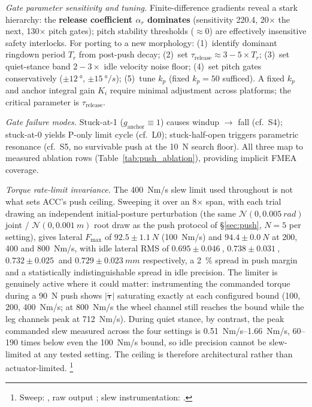 \documentclass[conference]{IEEEtran}
\begin{document}
\emph{Gate parameter sensitivity and tuning.}
Finite-difference gradients reveal a stark hierarchy: the \textbf{release coefficient $\alpha_r$ dominates} (sensitivity 220.4, \num{20}$\times$ the next, \num{130}$\times$ pitch gates); pitch stability thresholds (${\approx}0$) are effectively insensitive safety interlocks.
For porting to a new morphology: (1)~identify dominant ringdown period $T_r$ from post-push decay; (2)~set $\tau_{\text{release}} {\approx} 3{-}5{\times}T_r$; (3)~set quiet-stance band $2{-}3{\times}$ idle velocity noise floor; (4)~set pitch gates conservatively ($\pm\SI{12}{\degree}$, $\pm\SI{15}{\degree/s}$); (5)~tune $k_p$ (fixed $k_p{=}50$ sufficed).
A fixed $k_p$ and anchor integral gain $K_i$ require minimal adjustment across platforms; the critical parameter is $\tau_{\text{release}}$.

\emph{Gate failure modes.}
Stuck-at-1 ($g_{\text{anchor}}{\equiv}1$) causes windup $\rightarrow$ fall (cf.\ S4); stuck-at-0 yields P-only limit cycle (cf.\ L0); stuck-half-open triggers parametric resonance (cf.\ S5, no survivable push at the \SI{10}{N} search floor). All three map to measured ablation rows (Table~\ref{tab:push_ablation}), providing implicit FMEA coverage.

\emph{Torque rate-limit invariance.}
The \SI{400}{Nm/s} slew limit used throughout is not what sets ACC's push
ceiling. Sweeping it over an \num{8}$\times$ span, with each trial drawing an
independent initial-posture perturbation (the same
$\mathcal{N}(0,\SI{0.005}{rad})$ joint / $\mathcal{N}(0,\SI{0.001}{m})$ root
draw as the push protocol of \S\ref{sec:push}, $N{=}5$ per setting), gives
lateral $F_{\max}$ of $92.5{\pm}\SI{1.1}{N}$ (\SI{100}{Nm/s}) and
$94.4{\pm}\SI{0.0}{N}$ at \SI{200}{}, \SI{400}{} and \SI{800}{Nm/s}, with idle
lateral RMS of $0.695{\pm}\SI{0.046}{}$, $0.738{\pm}\SI{0.031}{}$,
$0.732{\pm}\SI{0.025}{}$ and $0.729{\pm}\SI{0.023}{mm}$ respectively, a \SI{2}{\percent} spread in push margin and a statistically indistinguishable
spread in idle precision.
The limiter is genuinely active where it could matter: instrumenting the
commanded torque during a \SI{90}{N} push shows $|\dot{\boldsymbol{\tau}}|$
saturating exactly at each configured bound (\SI{100}{}, \SI{200}{},
\SI{400}{Nm/s}; at \SI{800}{Nm/s} the wheel channel still reaches the bound
while the leg channels peak at \SI{712}{Nm/s}). During quiet stance, by
contrast, the peak commanded slew measured across the four settings is
\SIrange{0.51}{1.66}{Nm/s}, \numrange{60}{190} times below even the
\SI{100}{Nm/s} bound, so idle precision cannot be slew-limited at any tested
setting.
The ceiling is therefore architectural rather than actuator-limited.%
\footnote{Sweep: , raw output
; slew instrumentation:
.}
\end{document}
